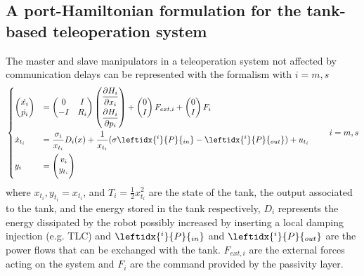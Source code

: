 \subsection{A port-Hamiltonian formulation for the tank-based teleoperation system }\label{sec:HamWithTank}
The master and slave manipulators in a teleoperation system not affected by communication delays can be represented with the formalism with $i=m,s$
\begin{equation}\label{teleop_Ham-Port-with-Tank}
	\left. 
	\begin{dcases}
		\begin{pmatrix}\dot{x_{i}} \\ \dot{p_{i}}\end{pmatrix}&= \begin{pmatrix} 0 & I \\-I & R_{i} \end{pmatrix} \begin{pmatrix} \dfrac{\partial H_{i}}{\partial x_{i}} \smallskip  \\ \dfrac{\partial H_{i}}{\partial p_{i}} \end{pmatrix} + \begin{pmatrix} 0\\ I\end{pmatrix}F_{ext,i} + \begin{pmatrix} 0 \\ I \end{pmatrix}F_{i}\\
		\dot{x}_{t_{i}} &= \dfrac{\sigma_{i}}{x_{t_{i}}}D_{i}(x) + \dfrac{1}{x_{t_{i}}}(\sigma \leftidx{^i}{P}{_{in}} -  \leftidx{^i}{P}{_{out}}) + u_{t_{i}}\\
		y_{i} &= 	\begin{pmatrix} v_{i} \\ \smallskip y_{t_{i}}\end{pmatrix}
	\end{dcases}
	\right. \qquad i=m,s
\end{equation}
where $x_{t_{i}}, y_{t_{i}} = x_{t_{i}}$, and $T_{i} = \frac{1}{2}x^{2}_{t_{i}}$ are the state of the tank, the output associated to the tank, and the energy stored in the tank respectively, $D_{i}$ represents the energy dissipated by the robot possibly increased by inserting a local damping injection (e.g. TLC) and $ \leftidx{^i}{P}{_{in}}$  and $\leftidx{^i}{P}{_{out}}$ are the power flows that can be exchanged with the tank. $F_{ext,i}$ are the external forces acting on the system and $F_{i}$ are the command provided by the passivity layer.\\
